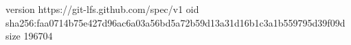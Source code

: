 version https://git-lfs.github.com/spec/v1
oid sha256:faa0714b75e427d96ac6a03a56bd5a72b59d13a31d16b1c3a1b559795d39f09d
size 196704
